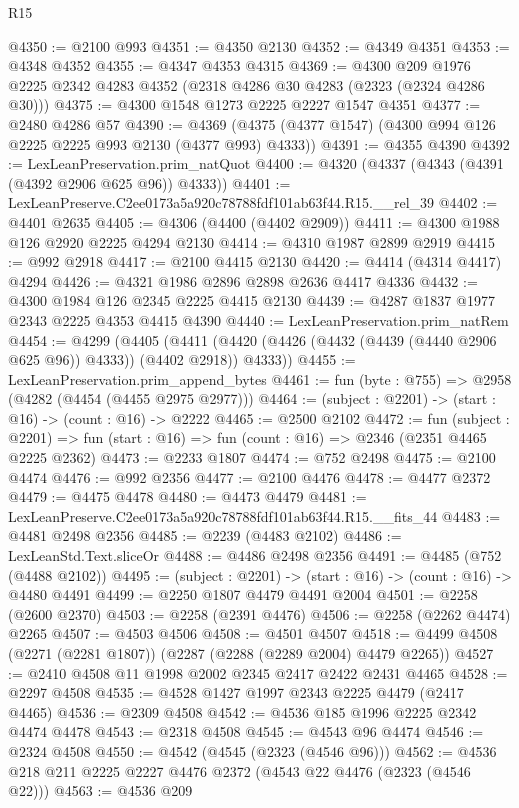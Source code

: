 \begin{lexlean}{R15}
\begin{coremodule}
@4350 := @2100 @993
@4351 := @4350 @2130
@4352 := @4349 @4351
@4353 := @4348 @4352
@4355 := @4347 @4353 @4315
@4369 := @4300 @209 @1976 @2225 @2342 @4283 @4352 (@2318 @4286 @30 @4283 (@2323 (@2324 @4286 @30)))
@4375 := @4300 @1548 @1273 @2225 @2227 @1547 @4351
@4377 := @2480 @4286 @57
@4390 := @4369 (@4375 (@4377 @1547) (@4300 @994 @126 @2225 @2225 @993 @2130 (@4377 @993) @4333))
@4391 := @4355 @4390
@4392 := LexLeanPreservation.prim_natQuot
@4400 := @4320 (@4337 (@4343 (@4391 (@4392 @2906 @625 @96)) @4333))
@4401 := LexLeanPreserve.C2ee0173a5a920c78788fdf101ab63f44.R15.__rel_39
@4402 := @4401 @2635
@4405 := @4306 (@4400 (@4402 @2909))
@4411 := @4300 @1988 @126 @2920 @2225 @4294 @2130
@4414 := @4310 @1987 @2899 @2919
@4415 := @992 @2918
@4417 := @2100 @4415 @2130
@4420 := @4414 (@4314 @4417) @4294
@4426 := @4321 @1986 @2896 @2898 @2636 @4417 @4336
@4432 := @4300 @1984 @126 @2345 @2225 @4415 @2130
@4439 := @4287 @1837 @1977 @2343 @2225 @4353 @4415 @4390
@4440 := LexLeanPreservation.prim_natRem
@4454 := @4299
    (@4405 (@4411 (@4420 (@4426 (@4432 (@4439 (@4440 @2906 @625 @96)) @4333)) (@4402 @2918)) @4333))
@4455 := LexLeanPreservation.prim_append_bytes
@4461 := fun (byte : @755) => @2958 (@4282 (@4454 (@4455 @2975 @2977)))
@4464 := (subject : @2201) -> (start : @16) -> (count : @16) -> @2222
@4465 := @2500 @2102
@4472 := fun (subject : @2201) =>
  fun (start : @16) => fun (count : @16) => @2346 (@2351 @4465 @2225 @2362)
@4473 := @2233 @1807
@4474 := @752 @2498
@4475 := @2100 @4474
@4476 := @992 @2356
@4477 := @2100 @4476
@4478 := @4477 @2372
@4479 := @4475 @4478
@4480 := @4473 @4479
@4481 := LexLeanPreserve.C2ee0173a5a920c78788fdf101ab63f44.R15.__fits_44
@4483 := @4481 @2498 @2356
@4485 := @2239 (@4483 @2102)
@4486 := LexLeanStd.Text.sliceOr
@4488 := @4486 @2498 @2356
@4491 := @4485 (@752 (@4488 @2102))
@4495 := (subject : @2201) -> (start : @16) -> (count : @16) -> @4480 @4491
@4499 := @2250 @1807 @4479 @4491 @2004
@4501 := @2258 (@2600 @2370)
@4503 := @2258 (@2391 @4476)
@4506 := @2258 (@2262 @4474) @2265
@4507 := @4503 @4506
@4508 := @4501 @4507
@4518 := @4499 @4508 (@2271 (@2281 @1807)) (@2287 (@2288 (@2289 @2004) @4479 @2265))
@4527 := @2410 @4508 @11 @1998 @2002 @2345 @2417 @2422 @2431 @4465
@4528 := @2297 @4508
@4535 := @4528 @1427 @1997 @2343 @2225 @4479 (@2417 @4465)
@4536 := @2309 @4508
@4542 := @4536 @185 @1996 @2225 @2342 @4474 @4478
@4543 := @2318 @4508
@4545 := @4543 @96 @4474
@4546 := @2324 @4508
@4550 := @4542 (@4545 (@2323 (@4546 @96)))
@4562 := @4536 @218 @211 @2225 @2227 @4476 @2372 (@4543 @22 @4476 (@2323 (@4546 @22)))
@4563 := @4536 @209

\end{coremodule}
\end{lexlean}
